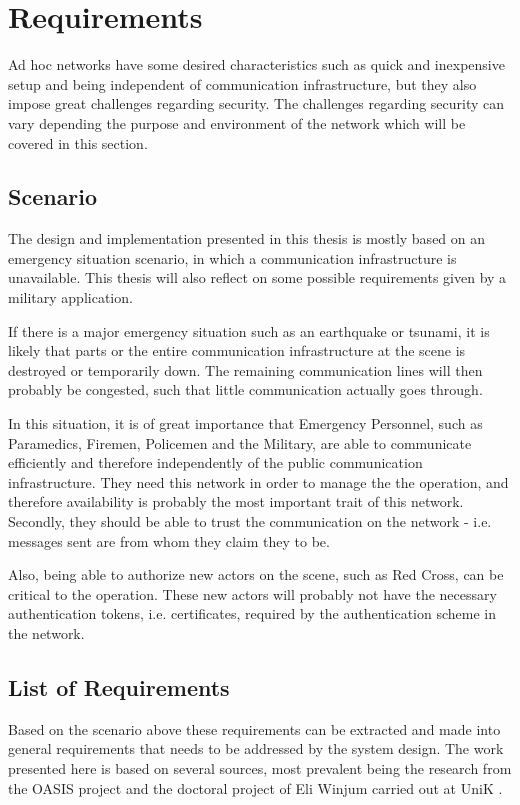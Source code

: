 \section{Requirements}
Ad hoc networks have some desired characteristics such as quick and inexpensive
setup and being independent of communication infrastructure, but they also
impose great challenges regarding security. The challenges regarding security
can vary depending the purpose and environment of the network which will be
covered in this section.

\subsection{Scenario}
The design and implementation presented in this thesis is mostly based on an
emergency situation scenario, in which a communication infrastructure is
unavailable. This thesis will also reflect on some possible requirements given
by a military application.

If there is a major emergency situation such as an earthquake or tsunami, it is
likely that parts or the entire communication infrastructure at the scene
is destroyed or temporarily down. The remaining communication lines will then
probably be congested, such that little communication actually goes through.

In this situation, it is of great importance that Emergency Personnel, such as
Paramedics, Firemen, Policemen and the Military, are able to communicate
efficiently and therefore independently of the public communication
infrastructure. They need this network in order to manage the the operation, and
therefore availability is probably the most important trait of this network.
Secondly, they should be able to trust the communication on the network - i.e.
messages sent are from whom they claim they to be.

Also, being able to authorize new actors on the scene, such as Red Cross, can be
critical to the operation. These new actors will probably not have the necessary
authentication tokens, i.e. certificates, required by the authentication scheme
in the network.

\subsection{List of Requirements}
Based on the scenario above these requirements can be extracted and made into
general requirements that needs to be addressed by the system design. The work
presented here is based on several sources, most prevalent being the research
from the OASIS project \cite{oasis_report} \cite{5683058} \cite{nyre2009secure}
and the doctoral project of Eli Winjum carried out at UniK
\cite{ffi_2005_04015}.

